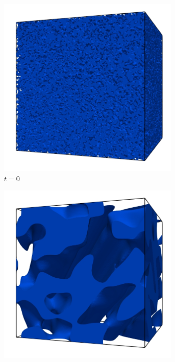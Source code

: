 \begin{figure}[htb]
    \centering
    \begin{subfigure}[t]{0.45\textwidth}
        \centering
        \includegraphics[width=0.95\textwidth]{Imagenes/Maxwell3D/Maxwell3D_sim/Imagenes/t_0}
        \caption{$t=0$}
    \end{subfigure}
    \begin{subfigure}[t]{0.45\textwidth}
        \centering
        \includegraphics[width=0.95\textwidth]{Imagenes/Maxwell3D/Maxwell3D_sim/Imagenes/t_100}

\end{subfigure}
\end{figure}
